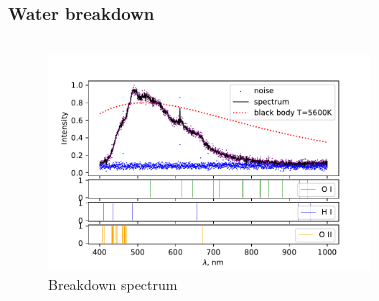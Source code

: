 \documentclass{beamer}
\begin{document}
	\begin{frame}
		\frametitle{Water breakdown}
		\begin{columns}
			\begin{figure}
				\centering
				\includegraphics[width=1.1\linewidth]{gen/water_lines.pdf}
				\caption*{Breakdown spectrum}
			\end{figure}	
			\begin{figure}
				\centering

\end{figure}
\end{columns}
\end{frame}
\end{document}

